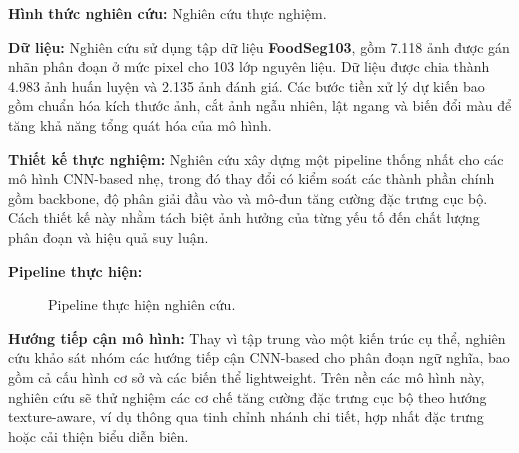 \textbf{Hình thức nghiên cứu:} Nghiên cứu thực nghiệm.

\textbf{Dữ liệu:} Nghiên cứu sử dụng tập dữ liệu \textbf{FoodSeg103}, gồm 7.118 ảnh được gán nhãn phân đoạn ở mức pixel cho 103 lớp nguyên liệu. Dữ liệu được chia thành 4.983 ảnh huấn luyện và 2.135 ảnh đánh giá. Các bước tiền xử lý dự kiến bao gồm chuẩn hóa kích thước ảnh, cắt ảnh ngẫu nhiên, lật ngang và biến đổi màu để tăng khả năng tổng quát hóa của mô hình.

\textbf{Thiết kế thực nghiệm:} Nghiên cứu xây dựng một pipeline thống nhất cho các mô hình CNN-based nhẹ, trong đó thay đổi có kiểm soát các thành phần chính gồm backbone, độ phân giải đầu vào và mô-đun tăng cường đặc trưng cục bộ. Cách thiết kế này nhằm tách biệt ảnh hưởng của từng yếu tố đến chất lượng phân đoạn và hiệu quả suy luận.

\textbf{Pipeline thực hiện:}
\begin{figure}[H]
    \centering
    \caption{Pipeline thực hiện nghiên cứu.}
    \label{fig:pipeline}
    \end{figure}

\textbf{Hướng tiếp cận mô hình:} Thay vì tập trung vào một kiến trúc cụ thể, nghiên cứu khảo sát nhóm các hướng tiếp cận CNN-based cho phân đoạn ngữ nghĩa, bao gồm cả cấu hình cơ sở và các biến thể lightweight. Trên nền các mô hình này, nghiên cứu sẽ thử nghiệm các cơ chế tăng cường đặc trưng cục bộ theo hướng texture-aware, ví dụ thông qua tinh chỉnh nhánh chi tiết, hợp nhất đặc trưng hoặc cải thiện biểu diễn biên.


